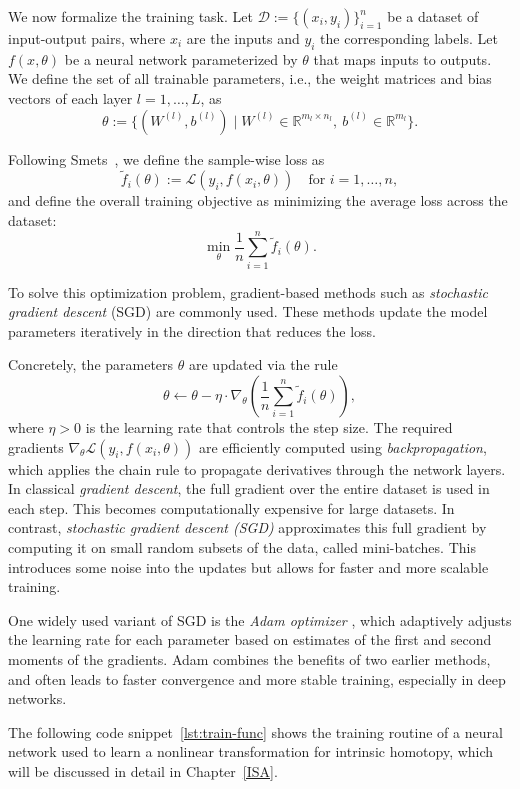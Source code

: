 We now formalize the training task. 
Let $\mathcal{D} := \{(x_i, y_i)\}_{i=1}^n$ be a dataset of input-output pairs, where $x_i$ are the inputs and $y_i$ the corresponding labels.  
Let $f(x, \theta)$ be a neural network parameterized by $\theta$ that maps inputs to outputs.  
We define the set of all trainable parameters, i.e., the weight matrices and bias vectors of each layer $l = 1,\dots,L$, as
\[
\theta := \{(W^{(l)}, b^{(l)}) \mid W^{(l)} \in \mathbb{R}^{m_l \times n_l},\ b^{(l)} \in \mathbb{R}^{m_l} \}.
\]

Following Smets~\cite{smets2024mathematicsneuralnetworkslecture}, we define the sample-wise loss as
\[
\tilde{f}_i(\theta) := \mathcal{L}(y_i, f(x_i, \theta)) \quad \text{for } i = 1, \dots, n,
\]
and define the overall training objective as minimizing the average loss across the dataset:
\[
\min_{\theta} \frac{1}{n} \sum_{i=1}^{n} \tilde{f}_i(\theta).
\]

To solve this optimization problem, gradient-based methods such as \emph{stochastic gradient descent} (SGD) are commonly used.  
These methods update the model parameters iteratively in the direction that reduces the loss.

Concretely, the parameters \(\theta\) are updated via the rule
\[
\theta \leftarrow \theta - \eta \cdot \nabla_\theta \left( \frac{1}{n} \sum_{i=1}^{n} \tilde{f}_i(\theta) \right),
\]
where \(\eta > 0\) is the learning rate that controls the step size.  
The required gradients \(\nabla_\theta \mathcal{L}(y_i, f(x_i, \theta))\) are efficiently computed using \emph{backpropagation}, which applies the chain rule to propagate derivatives through the network layers.
In classical \emph{gradient descent}, the full gradient over the entire dataset is used in each step. 
This becomes computationally expensive for large datasets.
In contrast, \emph{stochastic gradient descent (SGD)} approximates this full gradient by computing it on small random subsets of the data, called mini-batches.
This introduces some noise into the updates but allows for faster and more scalable training.

One widely used variant of SGD is the \emph{Adam optimizer} \cite{kingma2017adammethodstochasticoptimization}, which adaptively adjusts the learning rate for each parameter based on estimates of the first and second moments of the gradients.
Adam combines the benefits of two earlier methods, and often leads to faster convergence and more stable training, especially in deep networks.



The following code snippet~\ref{lst:train-func} shows the training routine of a neural network used to learn a nonlinear transformation for intrinsic homotopy, which will be discussed in detail in Chapter~\ref{ISA}.



